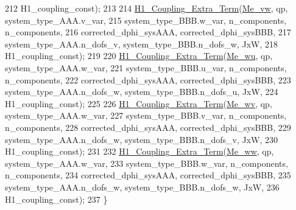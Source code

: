 \begin{DoxyCode}
212                 H1\_coupling\_const);
213 
214         \hyperlink{weak__formulations_8cpp_a9fcc3dd62b4a38808d4cfdae87d771e4}{H1\_Coupling\_Extra\_Term}(\hyperlink{classcarl_1_1coupling__matrices__3_a384c93a0e2bfe69a4b908b333e226113}{Me\_vw}, qp, system\_type\_AAA.v\_var,
215                 system\_type\_BBB.w\_var, n\_components, n\_components,
216                 corrected\_dphi\_sysAAA, corrected\_dphi\_sysBBB,
217                 system\_type\_AAA.n\_dofs\_v, system\_type\_BBB.n\_dofs\_w, JxW,
218                 H1\_coupling\_const);
219 
220         \hyperlink{weak__formulations_8cpp_a9fcc3dd62b4a38808d4cfdae87d771e4}{H1\_Coupling\_Extra\_Term}(\hyperlink{classcarl_1_1coupling__matrices__3_a3f3132dbd7587e504d12c047c598bc52}{Me\_wu}, qp, system\_type\_AAA.w\_var,
221                 system\_type\_BBB.u\_var, n\_components, n\_components,
222                 corrected\_dphi\_sysAAA, corrected\_dphi\_sysBBB,
223                 system\_type\_AAA.n\_dofs\_w, system\_type\_BBB.n\_dofs\_u, JxW,
224                 H1\_coupling\_const);
225 
226         \hyperlink{weak__formulations_8cpp_a9fcc3dd62b4a38808d4cfdae87d771e4}{H1\_Coupling\_Extra\_Term}(\hyperlink{classcarl_1_1coupling__matrices__3_a34a3d938e7ad54997b5d8a227614f983}{Me\_wv}, qp, system\_type\_AAA.w\_var,
227                 system\_type\_BBB.v\_var, n\_components, n\_components,
228                 corrected\_dphi\_sysAAA, corrected\_dphi\_sysBBB,
229                 system\_type\_AAA.n\_dofs\_w, system\_type\_BBB.n\_dofs\_v, JxW,
230                 H1\_coupling\_const);
231 
232         \hyperlink{weak__formulations_8cpp_a9fcc3dd62b4a38808d4cfdae87d771e4}{H1\_Coupling\_Extra\_Term}(\hyperlink{classcarl_1_1coupling__matrices__3_a9b360e5c33276d238262dfe40aaa4aeb}{Me\_ww}, qp, system\_type\_AAA.w\_var,
233                 system\_type\_BBB.w\_var, n\_components, n\_components,
234                 corrected\_dphi\_sysAAA, corrected\_dphi\_sysBBB,
235                 system\_type\_AAA.n\_dofs\_w, system\_type\_BBB.n\_dofs\_w, JxW,
236                 H1\_coupling\_const);
237     \}
\end{DoxyCode}
\hypertarget{classcarl_1_1coupling__matrices__3_aa7833efcb14dae2535e50228cfc4e766}{}
